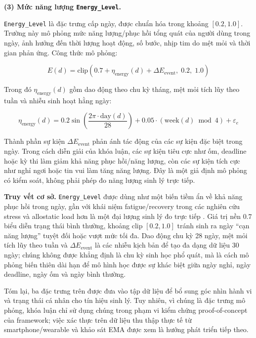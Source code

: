 \textbf{(3) Mức năng lượng \texttt{Energy\_Level}.}

\texttt{Energy\_Level} là đặc trưng cấp ngày, được chuẩn hóa trong khoảng $[0.2,1.0]$. Trường này mô phỏng mức năng lượng/phục hồi tổng quát của người dùng trong ngày, ảnh hưởng đến thời lượng hoạt động, số bước, nhịp tim do mệt mỏi và thời gian phản ứng. Công thức mô phỏng:

\begin{equation}
\label{eq:energy_level}
    E(d) = \text{clip}\left(0.7 + \eta_{\text{energy}}(d) + \Delta E_{\text{event}},\; 0.2,\; 1.0\right)
\end{equation}

Trong đó $\eta_{\text{energy}}(d)$ gồm dao động theo chu kỳ tháng, mệt mỏi tích lũy theo tuần và nhiễu sinh hoạt hằng ngày:

\begin{equation}
    \eta_{\text{energy}}(d)
    =
    0.2 \sin\left(\frac{2\pi \cdot \text{day}(d)}{28}\right)
    + 0.05 \cdot (\text{week}(d) \bmod 4)
    + \varepsilon_e
\end{equation}

Thành phần sự kiện $\Delta E_{\text{event}}$ phản ánh tác động của các sự kiện đặc biệt trong ngày. Trong cách diễn giải của khóa luận, các sự kiện tiêu cực như ốm, deadline hoặc kỳ thi làm giảm khả năng phục hồi/năng lượng, còn các sự kiện tích cực như nghỉ ngơi hoặc tin vui làm tăng năng lượng. Đây là một giả định mô phỏng có kiểm soát, không phải phép đo năng lượng sinh lý trực tiếp.

\textbf{Truy vết cơ sở.} \texttt{Energy\_Level} được dùng như một biến tiềm ẩn về khả năng phục hồi trong ngày, gần với khái niệm fatigue/recovery trong các nghiên cứu stress và allostatic load hơn là một đại lượng sinh lý đo trực tiếp \cite{mcewen2008central, wang2014studentlife}. Giá trị nền $0.7$ biểu diễn trạng thái bình thường, khoảng clip $[0.2,1.0]$ tránh sinh ra ngày ``cạn năng lượng'' tuyệt đối hoặc vượt mức tối đa. Dao động chu kỳ 28 ngày, mệt mỏi tích lũy theo tuần và $\Delta E_{\text{event}}$ là các nhiễu kịch bản để tạo đa dạng dữ liệu 30 ngày; chúng không được khẳng định là chu kỳ sinh học phổ quát, mà là cách mô phỏng biến thiên dài hạn để mô hình học được sự khác biệt giữa ngày nghỉ, ngày deadline, ngày ốm và ngày bình thường.

Tóm lại, ba đặc trưng trên được đưa vào tập dữ liệu để bổ sung góc nhìn hành vi và trạng thái cá nhân cho tín hiệu sinh lý. Tuy nhiên, vì chúng là đặc trưng mô phỏng, khóa luận chỉ sử dụng chúng trong phạm vi kiểm chứng proof-of-concept của framework; việc xác thực trên dữ liệu thu thập thực tế từ smartphone/wearable và khảo sát EMA được xem là hướng phát triển tiếp theo.


